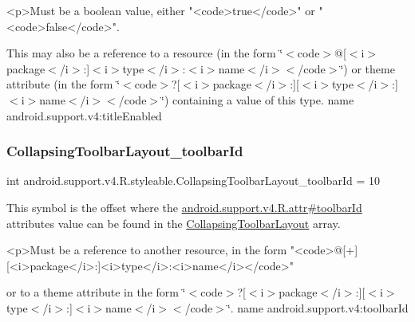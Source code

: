 \begin{DoxyVerb}      <p>Must be a boolean value, either "<code>true</code>" or "<code>false</code>".
\end{DoxyVerb}
 

This may also be a reference to a resource (in the form \char`\"{}$<$code$>$@\mbox{[}$<$i$>$package$<$/i$>$\+:\mbox{]}$<$i$>$type$<$/i$>$\+:$<$i$>$name$<$/i$>$$<$/code$>$\char`\"{}) or theme attribute (in the form \char`\"{}$<$code$>$?\mbox{[}$<$i$>$package$<$/i$>$\+:\mbox{]}\mbox{[}$<$i$>$type$<$/i$>$\+:\mbox{]}$<$i$>$name$<$/i$>$$<$/code$>$\char`\"{}) containing a value of this type.  name android.\+support.\+v4\+:title\+Enabled \mbox{\label{classandroid_1_1support_1_1v4_1_1R_1_1styleable_ab80f4b8280bdc2b619f7f20012eb6f41}} 
\subsubsection{\texorpdfstring{Collapsing\+Toolbar\+Layout\+\_\+toolbar\+Id}{CollapsingToolbarLayout\_toolbarId}}
{\footnotesize\ttfamily int android.\+support.\+v4.\+R.\+styleable.\+Collapsing\+Toolbar\+Layout\+\_\+toolbar\+Id = 10\hspace{0.3cm}{\ttfamily [static]}}

This symbol is the offset where the \hyperlink{classandroid_1_1support_1_1v4_1_1R_1_1attr_a9a14427b7f59c731ec884ed181ef9390}{android.\+support.\+v4.\+R.\+attr\#toolbar\+Id} attribute\textquotesingle{}s value can be found in the \hyperlink{classandroid_1_1support_1_1v4_1_1R_1_1styleable_a91b20e27088c910353d38c1efde32aa9}{Collapsing\+Toolbar\+Layout} array.

\begin{DoxyVerb}      <p>Must be a reference to another resource, in the form "<code>@[+][<i>package</i>:]<i>type</i>:<i>name</i></code>"
\end{DoxyVerb}
 or to a theme attribute in the form \char`\"{}$<$code$>$?\mbox{[}$<$i$>$package$<$/i$>$\+:\mbox{]}\mbox{[}$<$i$>$type$<$/i$>$\+:\mbox{]}$<$i$>$name$<$/i$>$$<$/code$>$\char`\"{}.  name android.\+support.\+v4\+:toolbar\+Id \mbox{\label{classandroid_1_1support_1_1v4_1_1R_1_1styleable_ab9cf77e48999c324e11a9b63f5429cfd}} 
